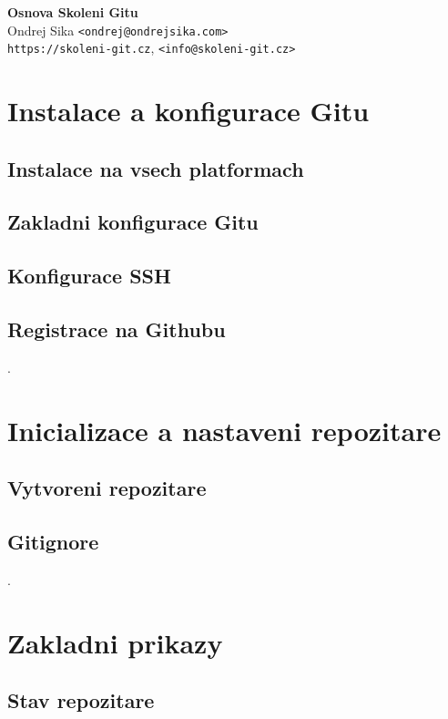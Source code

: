 \documentclass[11pt]{article}
\begin{document}
\begin{center}
{\Huge \bf Osnova Skoleni Gitu}\\
\vspace*{0.3cm}
{\Large
    Ondrej Sika  \texttt{<ondrej@ondrejsika.com>}\\
    \texttt{https://skoleni-git.cz}, \texttt{<info@skoleni-git.cz>}\\
}
\vspace*{0.6cm}
\end{center}

\section{Instalace a konfigurace Gitu}
\subsection{Instalace na vsech platformach}
\subsection{Zakladni konfigurace Gitu}
\subsection{Konfigurace SSH}
\subsection{Registrace na Githubu}

.

\section{Inicializace a nastaveni repozitare}
\subsection{Vytvoreni repozitare}
\subsection{Gitignore}

.

\section{Zakladni prikazy}
\subsection{Stav repozitare}
\end{document}
